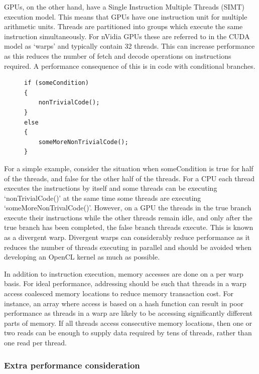 GPUs, on the other hand, have a Single Instruction Multiple Threads (SIMT)
execution model. This means that GPUs have one instruction unit for multiple
arithmetic units. Threads are partitioned into groups which execute the same
instruction simultaneously. For nVidia GPUs these are referred to in the CUDA
model as `warps' and typically contain 32 threads. This can increase performance
as this reduces the number of fetch and decode operations on instructions
required. A performance consequence of this is in code with conditional
branches.

\begin{figure}[H]
\small\begin{verbatim}
if (someCondition)
{
    nonTrivialCode();
}
else
{
    someMoreNonTrivialCode();
}
\end{verbatim}
\end{figure}

For a simple example, consider the situation when someCondition is true for half
of the threads, and false for the other half of the threads. For a CPU each
thread executes the instructions by itself and some threads can be executing
`nonTrivialCode()' at the same time some threads are executing
`someMoreNonTrivalCode()'. However, on a GPU the threads in the true branch
execute their instructions while the other threads remain idle, and only after
the true branch has been completed, the false branch threads execute. This is
known as a divergent warp. Divergent warps can considerably reduce performance
as it reduces the number of threads executing in parallel and should be avoided
when developing an OpenCL kernel as much as possible.

In addition to instruction execution, memory accesses are done on a per warp
basis. For ideal performance, addressing should be such that threads in a warp
access coalesced memory locations to reduce memory transaction cost. For
instance, an array where access is based on a hash function can result in poor
performance as threads in a warp are likely to be accessing significantly
different parts of memory. If all threads access consecutive memory locations,
then one or two reads can be enough to supply data required by tens of threads,
rather than one read per thread.

\subsubsection{Extra performance consideration}

